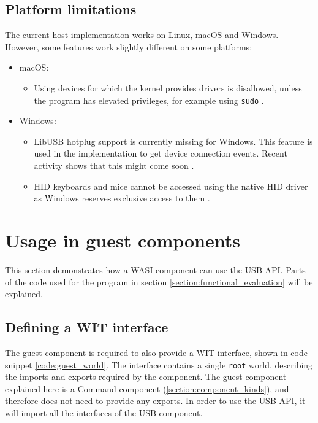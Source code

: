 \subsection{Platform limitations}
\label{section:platform_limitations}
The current host implementation works on Linux, macOS and Windows. However, some features work slightly different on some platforms:

\begin{itemize}
\item macOS: 
\begin{itemize}
\item Using devices for which the kernel provides drivers is disallowed, unless the program has elevated privileges, for example using \texttt{sudo} \cite{libusb_macos_limitations}.
\end{itemize}

\item Windows:
\begin{itemize}
\item LibUSB hotplug support is currently missing for Windows. This feature is used in the implementation to get device connection events. Recent activity shows that this might come soon \cite{libusb_hotplug_support}.
\item HID keyboards and mice cannot be accessed using the native HID driver as Windows reserves exclusive access to them \cite{libusb_windows_limitations}. 
\end{itemize}
\end{itemize}

\section{Usage in guest components}
This section demonstrates how a \acrshort{WASI} component can use the \acrshort{USB} \acrshort{API}. Parts of the code used for the program in section \ref{section:functional_evaluation} will be explained.

\subsection{Defining a \acrshort{WIT} interface}
The guest component is required to also provide a \acrshort{WIT} interface, shown in code snippet \ref{code:guest_world}. The interface contains a single \texttt{root} world, describing the imports and exports required by the component. The guest component explained here is a Command component (\ref{section:component_kinds}), and therefore does not need to provide any exports. In order to use the \acrshort{USB} \acrshort{API}, it will import all the interfaces of the \acrshort{USB} component.\\

